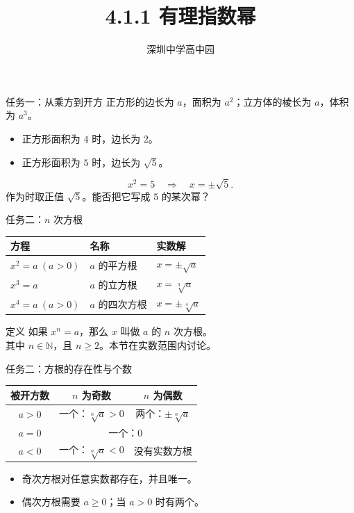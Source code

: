 \documentclass[aspectratio=169,10pt]{beamer}
\title{4.1.1 有理指数幂}
\author{深圳中学高中园}
\date{}
\begin{document}
\campusmaketitle

\begin{frame}[t]{任务一：从乘方到开方}
 正方形的边长为 $a$，面积为 $a^2$；立方体的棱长为 $a$，体积为 $a^3$。
 \gap
 \begin{itemize}
  \item 正方形面积为 $4$ 时，边长为 $2$。
  \item 正方形面积为 $5$ 时，边长为 $\sqrt5$。
 \end{itemize}
 \pause
 \[x^2=5\quad\Longrightarrow\quad x=\pm\sqrt5.\]
 作为时取正值 $\sqrt5$。能否把它写成 $5$ 的某次幂？
\end{frame}

\begin{frame}[t]{任务二：\texorpdfstring{$n$}{n} 次方根}
 \renewcommand{\arraystretch}{1.7}
 \centering
 \begin{tabular}{lll}
  \toprule 方程 & 名称 & 实数解\\\midrule
  $x^2=a\ (a>0)$ & $a$ 的平方根 & $x=\pm\sqrt a$\\
  $x^3=a$ & $a$ 的立方根 & $x=\sqrt[3]a$\\
  $x^4=a\ (a>0)$ & $a$ 的四次方根 & $x=\pm\sqrt[4]a$\\\bottomrule
 \end{tabular}
 \pause
 \begin{block}{定义}
  如果 $x^n=a$，那么 $x$ 叫做 $a$ 的 $n$ 次方根。\\
  其中 $n\in\mathbb N$，且 $n\ge2$。本节在实数范围内讨论。
 \end{block}
\end{frame}

\begin{frame}[t]{任务二：方根的存在性与个数}
 \renewcommand{\arraystretch}{1.65}
 \centering
 \begin{tabular}{c|c|c}
  \toprule 被开方数 & $n$ 为奇数 & $n$ 为偶数\\\midrule
  $a>0$ & 一个：$\sqrt[n]a>0$ & 两个：$\pm\sqrt[n]a$\\
  $a=0$ & \multicolumn{2}{c}{一个：$0$}\\
  $a<0$ & 一个：$\sqrt[n]a<0$ & 没有实数方根\\\bottomrule
 \end{tabular}
 \pause
 \gap
 \begin{itemize}
  \item 奇次方根对任意实数都存在，并且唯一。
  \item 偶次方根需要 $a\ge0$；当 $a>0$ 时有两个。
 \end{itemize}
\end{frame}
\end{document}
